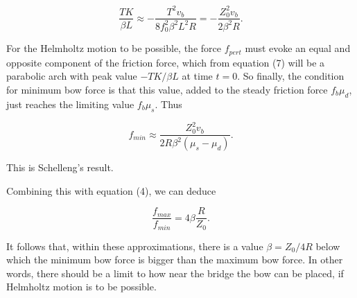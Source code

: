   $$\dfrac{TK}{\beta L} \approx -\dfrac{T^2 v_b}{8f_0^2 \beta^2 L^2 R}= 
  -\dfrac{Z_0^2 v_b}{2 \beta^2 R} . \tag{8} $$ 

  For the Helmholtz motion to be possible, the force $f_{pert}$ must evoke an 
  equal and opposite component of the friction force, which from equation (7) 
  will be a parabolic arch with peak value $-TK/\beta L$ at time $t=0$. So 
  finally, the condition for minimum bow force is that this value, added to the 
  steady friction force $f_b \mu_d$, just reaches the limiting value $f_b 
  \mu_s$. Thus 

  $$f_{min} \approx \dfrac{Z_0^2 v_b}{2 R \beta^2 (\mu_s-\mu_d)} . \tag{9}$$ 

  This is Schelleng's result. 

  Combining this with equation (4), we can deduce 

  $$\dfrac{f_{max}}{f_{min}}=4 \beta \dfrac{R}{Z_0} . \tag{10}$$ 

  It follows that, within these approximations, there is a value $\beta=Z_0/4R$ 
  below which the minimum bow force is bigger than the maximum bow force. In 
  other words, there should be a limit to how near the bridge the bow can be 
  placed, if Helmholtz motion is to be possible. 